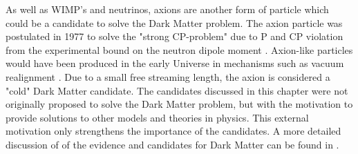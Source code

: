 \newline
As well as WIMP's and neutrinos, axions are another form of particle which could be a candidate to solve the Dark Matter problem. The axion particle was postulated in 1977 \cite{ConsvCP} to solve the "strong CP-problem" due to P and CP violation from the experimental bound on the neutron dipole moment \cite{NeutronDi}. Axion-like particles would have been produced in the early Universe in mechanisms such as vacuum realignment \cite{InvisAx}. Due to a small free streaming length, the axion is considered a "cold" Dark Matter candidate. 
\newline
The candidates discussed in this chapter were not originally proposed to solve the Dark Matter problem, but with the motivation to provide solutions to other models and theories in physics. This external motivation only strengthens the importance of the candidates. A more detailed discussion of of the evidence and candidates for Dark Matter can be found in \cite{DMCandidates}.